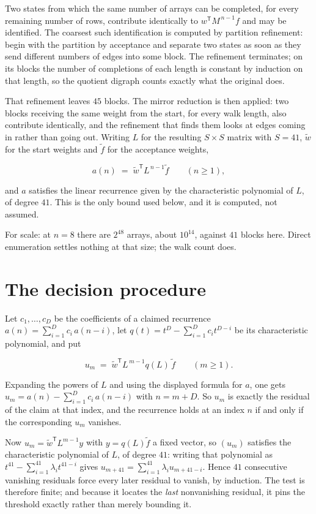 \documentclass[11pt]{article}
\theoremstyle{definition}
\begin{document}
Two states from which the same number of arrays can be completed, for every remaining number of rows, contribute identically to $w^{\mathsf T}M^{\,n-1}f$ and may be identified. The coarsest such identification is computed by partition refinement: begin with the partition by acceptance and separate two states as soon as they send different numbers of edges into some block. The refinement terminates; on its blocks the number of completions of each length is constant by induction on that length, so the quotient digraph counts exactly what the original does.

That refinement leaves $45$ blocks. The mirror reduction is then applied: two blocks receiving the same weight from the start, for every walk length, also contribute identically, and the refinement that finds them looks at edges coming in rather than going out. Writing $L$ for the resulting $S \times S$ matrix with $S = 41$, $\tilde w$ for the start weights and $\tilde f$ for the acceptance weights,

\[a(n) \;=\; \tilde w^{\mathsf T} L^{\,n-1} \tilde f \qquad (n \ge 1),\]

and $a$ satisfies the linear recurrence given by the characteristic polynomial of $L$, of degree $41$. This is the only bound used below, and it is computed, not assumed.

For scale: at $n = 8$ there are $2^{48}$ arrays, about $10^{14}$, against $41$ blocks here. Direct enumeration settles nothing at that size; the walk count does.

\section{The decision procedure}

Let $c_1,\dots,c_D$ be the coefficients of a claimed recurrence $a(n) = \sum_{i=1}^{D} c_i\,a(n-i)$, let $q(t) = t^{D} - \sum_{i=1}^{D} c_i t^{D-i}$ be its characteristic polynomial, and put

\[u_m \;=\; \tilde w^{\mathsf T} L^{\,m-1} q(L)\,\tilde f \qquad (m \ge 1).\]

Expanding the powers of $L$ and using the displayed formula for $a$, one gets $u_m = a(n) - \sum_{i=1}^{D} c_i\,a(n-i)$ with $n = m + D$. So $u_m$ is exactly the residual of the claim at that index, and the recurrence holds at an index $n$ if and only if the corresponding $u_m$ vanishes.

Now $u_m = \tilde w^{\mathsf T} L^{m-1} y$ with $y = q(L)\tilde f$ a fixed vector, so $(u_m)$ satisfies the characteristic polynomial of $L$, of degree $41$: writing that polynomial as $t^{41} - \sum_{i=1}^{41} \lambda_i t^{41-i}$ gives $u_{m+41} = \sum_{i=1}^{41} \lambda_i u_{m+41-i}$. Hence $41$ consecutive vanishing residuals force every later residual to vanish, by induction. The test is therefore finite; and because it locates the {\itshape last} nonvanishing residual, it pins the threshold exactly rather than merely bounding it.
\end{document}
